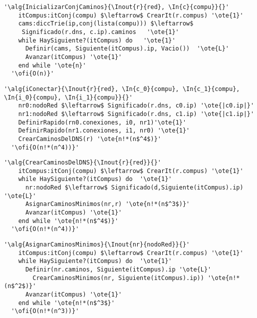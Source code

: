 \begin{lstlisting}[mathescape]
  '\alg{InicializarConjCaminos}{\Inout{r}{red}, \In{c}{compu}}{}'
    itCompus:itConj(compu) $\leftarrow$ CrearIt(r.compus) '\ote{1}'
    cams:diccTrie(ip,conj(lista(compu))) $\leftarrow$
     Significado(r.dns, c.ip).caminos   '\ote{1}'
    while HaySiguiente?(itCompus) do   '\ote{1}'                                                 
      Definir(cams, Siguiente(itCompus).ip, Vacio())  '\ote{L}'
      Avanzar(itCompus) '\ote{1}'
    end while '\ote{n}'
  '\ofi{O(n)}'
\end{lstlisting}

\begin{lstlisting}[mathescape]
  '\alg{iConectar}{\Inout{r}{red}, \In{c_0}{compu}, \In{c_1}{compu}, \In{i_0}{compu}, \In{i_1}{compu}}{}'
    nr0:nodoRed $\leftarrow$ Significado(r.dns, c0.ip) '\ote{|c0.ip|}'
    nr1:nodoRed $\leftarrow$ Significado(r.dns, c1.ip) '\ote{|c1.ip|}'
    DefinirRapido(rn0.conexiones, i0, nr1)'\ote{1}'
    DefinirRapido(nr1.conexiones, i1, nr0) '\ote{1}'
    CrearCaminosDelDNS(r) '\ote{n!*(n$^4$)}'
  '\ofi{O(n!*(n^4))}'
\end{lstlisting}

\begin{lstlisting}[mathescape]
  '\alg{CrearCaminosDelDNS}{\Inout{r}{red}}{}'
    itCompus:itConj(compu) $\leftarrow$ CrearIt(r.compus) '\ote{1}'
    while HaySiguiente?(itCompus) do  '\ote{1}'                                                  
      nr:nodoRed $\leftarrow$ Significado(d,Siguiente(itCompus).ip) '\ote{L}'
      AsignarCaminosMinimos(nr,r) '\ote{n!*(n$^3$)}'
      Avanzar(itCompus) '\ote{1}'
    end while '\ote{n!*(n$^4$)}'
  '\ofi{O(n!*(n^4))}'
\end{lstlisting}

\begin{lstlisting}[mathescape]
  '\alg{AsignarCaminosMinimos}{\Inout{nr}{nodoRed}}{}'
    itCompus:itConj(compu) $\leftarrow$ CrearIt(r.compus) '\ote{1}'
    while HaySiguiente?(itCompus) do  '\ote{1}'                                                
      Definir(nr.caminos, Siguiente(itCompus).ip '\ote{L}'
        CrearCaminosMinimos(nr, Siguiente(itCompus).ip)) '\ote{n!*(n$^2$)}'
      Avanzar(itCompus) '\ote{1}'
    end while '\ote{n!*(n$^3$}'
  '\ofi{O(n!*(n^3))}'
\end{lstlisting}

